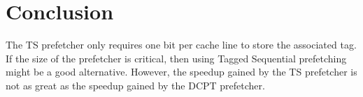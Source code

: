 \section{Conclusion}

The TS prefetcher only requires one bit per cache line to store
the associated tag. If the size of the prefetcher is critical, then using Tagged
Sequential prefetching might be a good alternative. However, the speedup gained
by the TS prefetcher is not as great as the speedup gained by the
DCPT prefetcher.

